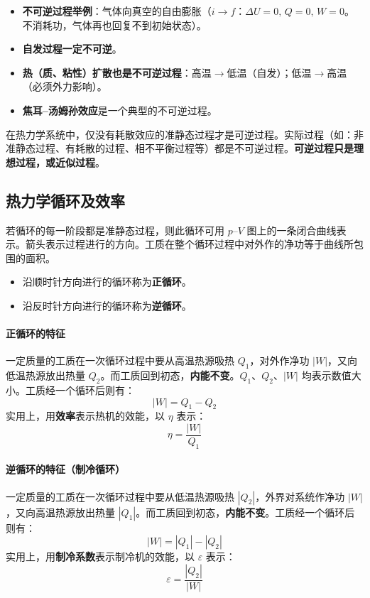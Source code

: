 \documentclass[UTF8]{ctexart}
\begin{document}
\begin{itemize}[leftmargin=2em]
  \item \textbf{不可逆过程举例}：气体向真空的自由膨胀（$i\to f$：$\Delta U=0,\,Q=0,\,W=0$。不消耗功，气体再也回复不到初始状态）。
  \item \textbf{自发过程一定不可逆}。
  \item \textbf{热（质、粘性）扩散也是不可逆过程}：高温$\to$低温（自发）；低温$\to$高温（必须外力影响）。
  \item \textbf{焦耳--汤姆孙效应}是一个典型的不可逆过程。
\end{itemize}

在热力学系统中，仅没有耗散效应的准静态过程才是可逆过程。实际过程（如：非准静态过程、有耗散的过程、相不平衡过程等）都是不可逆过程。\textbf{可逆过程只是理想过程，或近似过程}。


\subsection{热力学循环及效率}

若循环的每一阶段都是准静态过程，则此循环可用 $p$--$V$ 图上的一条闭合曲线表示。箭头表示过程进行的方向。工质在整个循环过程中对外作的净功等于曲线所包围的面积。

\begin{itemize}[leftmargin=2em]
  \item 沿顺时针方向进行的循环称为\textbf{正循环}。
  \item 沿反时针方向进行的循环称为\textbf{逆循环}。
\end{itemize}

\paragraph{正循环的特征}
一定质量的工质在一次循环过程中要从高温热源吸热 $Q_1$，对外作净功 $|W|$，又向低温热源放出热量 $Q_2$。而工质回到初态，\textbf{内能不变}。$Q_1$、$Q_2$、$|W|$ 均表示数值大小。工质经一个循环后则有：
\[
|W|=Q_1-Q_2
\]
实用上，用\textbf{效率}表示热机的效能，以 $\eta$ 表示：
\[
\boxed{\eta=\frac{|W|}{Q_1}}
\]

\paragraph{逆循环的特征（制冷循环）}
一定质量的工质在一次循环过程中要从低温热源吸热 $|Q_2|$，外界对系统作净功 $|W|$，又向高温热源放出热量 $|Q_1|$。而工质回到初态，\textbf{内能不变}。工质经一个循环后则有：
\[
|W|=|Q_1|-|Q_2|
\]
实用上，用\textbf{制冷系数}表示制冷机的效能，以 $\varepsilon$ 表示：
\[
\boxed{\varepsilon=\frac{|Q_2|}{|W|}}
\]
\end{document}
